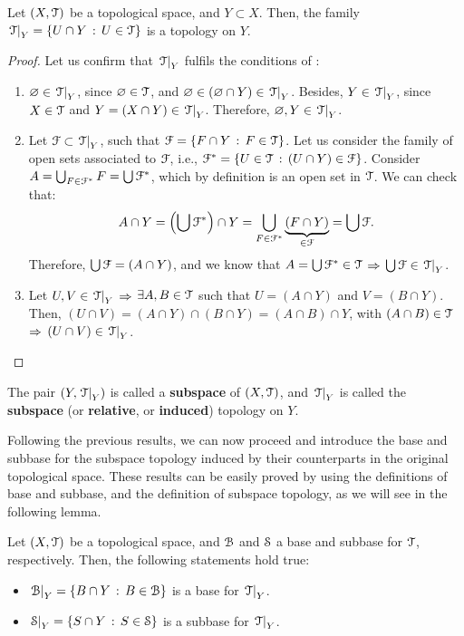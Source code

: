 \begin{theorem}
	\label{th:subspace-topology}
	Let $(X, \T)$ be a topological space, and $Y\subset X$. Then, the family
	$\Trel{Y} = \setdef{U\cap Y}{U\in\T}$ is a topology on $Y$.
\end{theorem}
\begin{proof}
Let us confirm that $\Trel{Y}$ fulfils the conditions of :
	\begin{enumerate}
		\item $\emptyset\in\Trel{Y}$, since $\emptyset\in\T$, and $\emptyset\in(\emptyset\cap Y)\in \Trel{Y}$. Besides,
		$Y\in \Trel{Y}$, since $X\in\T$ and $Y=(X\cap Y)\in \Trel{Y}$. Therefore, $\emptyset, Y\in \Trel{Y}$.
		\item Let $\F\subset \Trel{Y}$, such that $\F=\setdef{F\cap Y}{F\in \T}$. Let us consider the family of
		open sets associated to $\F$, i.e., $\F^*=\setdef{U\in\T}{(U\cap Y)\in \F}$. Consider
		$A=\bigcup_{F\in\F^*}F=\bigcup \F^*$, which by definition is an open set in $\T$.
		We can check that:
		$$
		A\cap Y = \left(\bigcup\F^*\right)\cap Y=\bigcup_{F\in \F^*}\underbrace{(F\cap Y)}_{\in\F}=\bigcup \F.
		$$
		Therefore, $\bigcup \F = (A\cap Y)$, and we know that $A=\bigcup \F^* \in \T$ $\Then$ $\bigcup \F\in \Trel{Y}$.
		\item Let $U, V\in \Trel{Y}$ $\Then$ $\exists A, B\in \T$ such that $U=(A\cap Y)$ and $V=(B\cap Y)$. Then,
		$(U\cap V) = (A\cap Y)\cap(B\cap Y) = (A\cap B)\cap Y$, with $(A\cap B)\in \T$ $\Then$ $(U\cap V)\in \Trel{Y}$.
	\end{enumerate}
\end{proof}


\begin{definition}
	\label{def:subspace-topology}
	The pair $(Y, \Trel{Y})$ is called a \textbf{subspace} of $(X, \T)$,
	and $\Trel{Y}$ is called the \textbf{subspace} (or \textbf{relative}, or \textbf{induced}) {topology} on $Y$.
\end{definition}

Following the previous results, we can now proceed and introduce the base and subbase
for the subspace topology induced by their counterparts in the original topological space.
These results can be easily proved by using the definitions of base and subbase, and
the definition of subspace topology, as we will see in the following lemma.

\begin{lemma}
	\label{lem:subspace-topology-base}
	Let $(X, \T)$ be a topological space, and $\B$ and $\S$ a base and subbase for $\T$, respectively.
	Then, the following statements hold true:
	\begin{itemize}
		\item $\Rel{\B}{Y}=\setdef{B\cap Y}{B\in\B}$ is a base for $\Trel{Y}$.
		\item $\Rel{\S}{Y}=\setdef{S\cap Y}{S\in\S}$ is a subbase for $\Trel{Y}$.
	\end{itemize}
\end{lemma}

